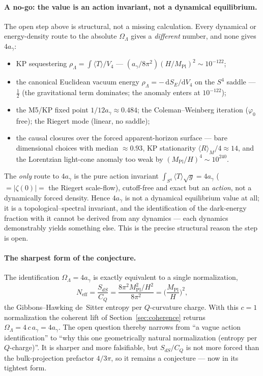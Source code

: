 \documentclass[11pt,a4paper]{article}
\theoremstyle{plain}
\theoremstyle{definition}
\theoremstyle{remark}
\newcommand{\OL}{\Omega_\Lambda}
\newcommand{\ag}{a_\gamma}
\newcommand{\CQ}{C_Q}
\newcommand{\Mpl}{M_{\mathrm{Pl}}}
\newcommand{\avg}[1]{\langle #1 \rangle}
\begin{document}
\paragraph{A no-go: the value is an action invariant, not a dynamical equilibrium.} The open step
above is structural, not a missing calculation. Every dynamical or energy-density route to the
absolute $\OL$ gives a \emph{different} number, and none gives $4\ag$:
\begin{itemize}[topsep=2pt,itemsep=1pt]
  \item KP sequestering $\rho_\Lambda = \int\avg{T}/V_4$ --- $(\ag/8\pi^2)(H/\Mpl)^2 \sim 10^{-122}$;
  \item the canonical Euclidean vacuum energy $\rho_\Lambda = -\,\mathrm{d}S_E/\mathrm{d}V_4$ on the
  $S^4$ saddle --- $\tfrac12$ (the gravitational term dominates; the anomaly enters at $10^{-122}$);
  \item the M5/KP fixed point $1/12\ag \approx 0.484$; the Coleman--Weinberg iteration ($\varphi_0$
  free); the Riegert mode (linear, no saddle);
  \item the causal closures over the forced apparent-horizon surface --- bare dimensional choices
  with median $\approx0.93$, KP stationarity $\avg{R}_M/4\approx14$, and the Lorentzian light-cone
  anomaly too weak by $(\Mpl/H)^4\sim10^{240}$.
\end{itemize}
The \emph{only} route to $4\ag$ is the pure action invariant $\int_{S^4}\avg{T}\sqrt{g} = 4\ag$
($=|\zeta(0)|=$ the Riegert scale-flow), cutoff-free and exact but an \emph{action}, not a
dynamically forced density. Hence $4\ag$ is not a dynamical equilibrium value at all; it is a
topological--spectral invariant, and the identification of the dark-energy fraction with it cannot
be derived from any dynamics --- each dynamics demonstrably yields something else. This is the
precise structural reason the step is open.

\paragraph{The sharpest form of the conjecture.} The identification $\OL = 4\ag$ is exactly
equivalent to a single normalization,
\begin{equation}
\label{eq:sdscq}
N_{\mathrm{eff}} = \frac{S_{dS}}{\CQ}
= \frac{8\pi^2\Mpl^2/H^2}{8\pi^2} = \Big(\frac{\Mpl}{H}\Big)^2 ,
\end{equation}
the Gibbons--Hawking de~Sitter entropy per $Q$-curvature charge. With this $c=1$ normalization the
coherent lift of Section~\ref{sec:coherence} returns $\OL = 4\,c\,\ag = 4\ag$. The open question
thereby narrows from ``a vague action identification'' to ``why this one geometrically natural
normalization (entropy per $Q$-charge)''. It is sharper and more falsifiable, but $S_{dS}/\CQ$ is
not more forced than the bulk-projection prefactor $4/3\pi$, so it remains a conjecture --- now in
its tightest form.
\end{document}
